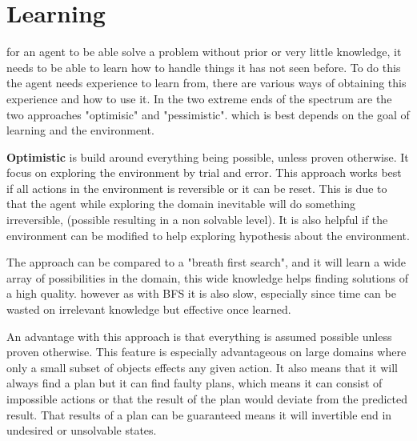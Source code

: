 \chapter{Learning}
	for an agent to be able solve a problem without prior or very little knowledge, it needs to be able to learn how to handle things it has not seen before. To do this the agent needs experience to learn from, there are various ways of obtaining this experience and how to use it. In the two extreme ends of the spectrum are the two approaches "optimisic" and "pessimistic". which is best depends on the goal of learning and the environment.
	
	\textbf{Optimistic} is build around everything being possible, unless proven otherwise. It focus on exploring the environment by trial and error. This approach works best if all actions in the environment is reversible or it can be reset. This is due to that the agent while exploring the domain inevitable will do something irreversible, (possible resulting in a non solvable level). It is also helpful if the environment can be modified to help exploring hypothesis about the environment.
		
	The approach can be compared to a "breath first search", and it will learn a wide array of possibilities in the domain, this wide knowledge helps finding solutions of a high quality. however as with BFS it is also slow, especially since time can be wasted on irrelevant knowledge but effective once learned.


	An advantage with this approach is that everything is assumed possible unless proven otherwise. This feature is especially advantageous on large domains where only a small subset of objects effects any given action. It also means that it will always find a plan but it can find faulty plans, which means it can consist of impossible actions or that the result of the plan would deviate from the predicted result. That results of a plan can be guaranteed means it will invertible end in undesired or unsolvable states. 
				

		
		
